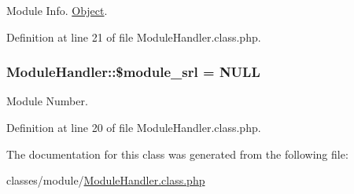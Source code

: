 Module Info. \hyperlink{classObject}{Object}. 



Definition at line 21 of file Module\-Handler.\-class.\-php.

\hypertarget{classModuleHandler_ad79751537e64d7bfc7dc6fa4280043b0}{
\subsubsection[{\$module\-\_\-srl}]{\setlength{\rightskip}{0pt plus 5cm}Module\-Handler\-::\$module\-\_\-srl = N\-U\-L\-L}}\label{classModuleHandler_ad79751537e64d7bfc7dc6fa4280043b0}


Module Number. 



Definition at line 20 of file Module\-Handler.\-class.\-php.



The documentation for this class was generated from the following file\-:\begin{DoxyCompactItemize}
\item 
classes/module/\hyperlink{ModuleHandler_8class_8php}{Module\-Handler.\-class.\-php}\end{DoxyCompactItemize}
